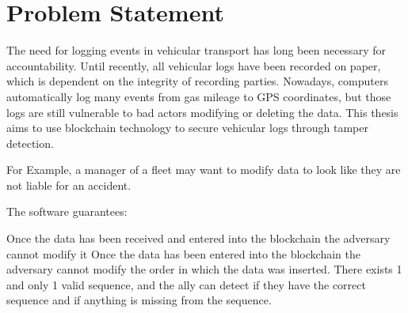 \chapter{Problem Statement}
\label{problemstate}
        The need for logging events in vehicular transport has long been necessary for accountability. Until recently, all vehicular logs have been recorded on paper, which is dependent on the integrity of recording parties. Nowadays, computers automatically log many events from gas mileage to GPS coordinates, but those logs are still vulnerable to bad actors modifying or deleting the data. This thesis aims to use blockchain technology to secure vehicular logs through tamper detection. 
        
        For Example, a manager of a fleet may want to modify data to look like they are not liable for an accident.
        
        The software guarantees: 
\begin{outline}
\1         Once the data has been received and entered into the blockchain the adversary cannot modify it
\1  Once the data has been entered into the blockchain the adversary cannot modify the order in which the data was inserted.
\1         There exists 1 and only 1 valid sequence, and the ally can detect if they have the correct sequence and if anything is missing from the sequence.
\end{outline}